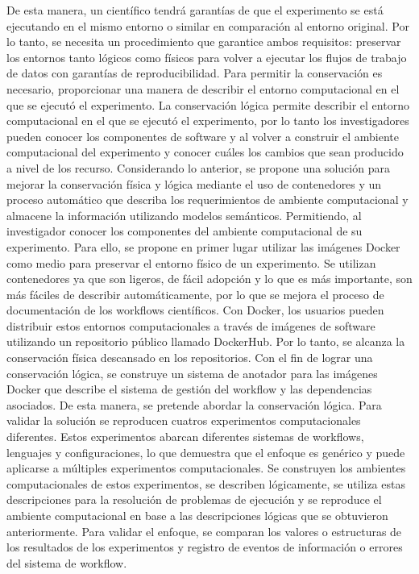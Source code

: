 De esta manera, un científico tendrá garantías de que el experimento se está ejecutando en el mismo entorno o similar en comparación al entorno original.
Por lo tanto, se necesita un procedimiento que garantice ambos requisitos: preservar los entornos tanto lógicos como físicos para volver a ejecutar los flujos de trabajo de datos con garantías de reproducibilidad.
Para permitir la conservación es necesario, proporcionar una manera de describir el entorno computacional en el que se ejecutó el experimento. 
La conservación lógica permite describir el entorno computacional en el que se ejecutó el experimento, por lo tanto los investigadores pueden conocer los componentes de software y al volver a construir el ambiente computacional del experimento y conocer cuáles los cambios que sean producido a nivel de los recurso.
Considerando lo anterior, se propone una solución para mejorar la conservación física y lógica mediante el uso de contenedores y un proceso automático que describa los requerimientos de ambiente computacional y almacene la información utilizando modelos semánticos. Permitiendo, al investigador conocer los componentes del ambiente computacional de su experimento.
Para ello, se propone en primer lugar utilizar las imágenes Docker como medio para preservar el entorno físico de un experimento. Se utilizan contenedores ya que son ligeros, de fácil adopción y lo que es más importante, son más fáciles de describir automáticamente, por lo que se mejora el proceso de documentación de los workflows científicos.
Con Docker, los usuarios pueden distribuir estos entornos computacionales a través de imágenes de software utilizando un repositorio público llamado DockerHub. Por lo tanto, se alcanza la conservación física descansado en los repositorios.
Con el fin de lograr una conservación lógica, se construye un sistema de anotador para las imágenes Docker que describe el sistema de gestión del workflow y las dependencias asociados. De esta manera, se pretende abordar la conservación lógica.
Para validar la solución se reproducen cuatros experimentos computacionales diferentes. Estos experimentos abarcan diferentes sistemas de workflows, lenguajes y configuraciones, lo que demuestra que el enfoque es genérico y puede aplicarse a múltiples experimentos computacionales.
Se construyen los ambientes computacionales de estos experimentos, se describen lógicamente, se utiliza estas descripciones para la resolución de problemas de ejecución y se reproduce el ambiente computacional en base a las descripciones lógicas que se obtuvieron anteriormente.
Para validar el enfoque, se comparan los valores o estructuras de los resultados de los experimentos y registro de eventos de información o errores del sistema de workflow.

